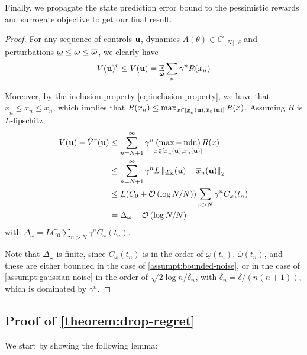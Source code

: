 \documentclass{article}
\begin{document}
Finally, we propagate the state prediction error bound to the pessimistic rewards and surrogate objective to get our final result.
\begin{proof}
  
 For any sequence of controls $\mathbf{u}$, dynamics $A(\theta)\in C_{[N],\delta}$ and perturbations $\underline{\bm{\omega}} \leq \bm{\omega} \leq \overline{\bm{\omega}}$, we clearly have 
 \[V(\mathbf{u})^r \leq V(\mathbf{u}) = \operatorname*{\mathbb{E}}_{\bm{\omega}}\sum_n \gamma^n R(x_n)\]
 
 Moreover, by the inclusion property \eqref{eq:inclusion-property}, we have that $\underline{x}_n \leq x_n \leq \overline{x}_n$, which implies that $R(x_n) \leq \max_{x\in[\underline{x}_n(\mathbf{u}), \overline{x}_n(\mathbf{u})]}  R(x)$. Assuming $R$ is $L$-lipschitz,
 \begin{align*}
     V(\mathbf{u}) - \hat{V}^r(\mathbf{u}) &\leq \sum_{n=N+1}^\infty \gamma^n \underset{{x\in[\underline{x}_n(\mathbf{u}), \overline{x}_n(\mathbf{u})]}}{(\max - \min)} R(x)\\
     &\leq \sum_{n=N+1}^\infty \gamma^n L \left\|\underline{x}_n(\mathbf{u}) - \overline{x}_n(\mathbf{u})\right\|_2\\
     &\leq L(C_0 + \mathcal{O}\left({\log N / N}\right)) \sum_{n>N} \gamma^n C_{\omega}(t_n)\\
     &= \Delta_\omega + \mathcal{O}\left({\log N / N}\right)
 \end{align*}
 with $\Delta_\omega = L C_0\sum_{n>N} \gamma^n C_{\omega}(t_n)$.
 
 Note that $\Delta_\omega$ is finite, since $C_{\omega}(t_n)$ is in the order of $\underline{\omega}(t_n)$, $\overline{\omega}(t_n)$, and these are either bounded in the case of \autoref{assumpt:bounded-noise}, or in the case of \autoref{assumpt:gaussian-noise} in the order of $\sqrt{2\log n / \delta_n}$, with $\delta_n = \delta/(n(n+1))$, which is dominated by $\gamma^n$.
\end{proof}


\subsection{Proof of \autoref{theorem:drop-regret}}

We start by showing the following lemma:
\end{document}
